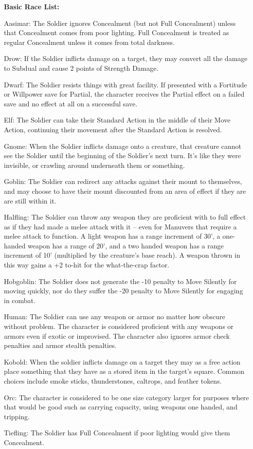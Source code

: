 \textbf{Basic Race List:}
\begin{description*}
\item[Aasimar:] The Soldier ignores Concealment (but not Full Concealment) unless that Concealment comes from poor lighting. Full Concealment is treated as regular Concealment unless it comes from total darkness.
\item[Drow:] If the Soldier inflicts damage on a target, they may convert all the damage to Subdual and cause 2 points of Strength Damage.
\item[Dwarf:] The Soldier resists things with great facility. If presented with a Fortitude or Willpower save for Partial, the character receives the Partial effect on a failed save and no effect at all on a successful save.
\item[Elf:] The Soldier can take their Standard Action in the middle of their Move Action, continuing their movement after the Standard Action is resolved.
\item[Gnome:] When the Soldier inflicts damage onto a creature, that creature cannot see the Soldier until the beginning of the Soldier's next turn. It's like they were invisible, or crawling around underneath them or something.
\item[Goblin:] The Soldier can redirect any attacks against their mount to themselves, and may choose to have their mount discounted from an area of effect if they are are still within it.
\item[Halfling:] The Soldier can throw any weapon they are proficient with to full effect as if they had made a melee attack with it -- even for Manuvers that require a melee attack to function. A light weapon has a range increment of 30', a one-handed weapon has a range of 20', and a two handed weapon has a range increment of 10' (multiplied by the creature's base reach). A weapon thrown in this way gains a +2 to-hit for the what-the-crap factor.
\item[Hobgoblin:] The Soldier does not generate the -10 penalty to Move Silently for moving quickly, nor do they suffer the -20 penalty to Move Silently for engaging in combat.
\item[Human:] The Soldier can use any weapon or armor no matter how obscure without problem. The character is considered proficient with any weapons or armors even if exotic or improvised. The character also ignores armor check penalties and armor stealth penalties.
\item[Kobold:] When the soldier inflicts damage on a target they may as a free action place something that they have as a stored item in the target's square. Common choices include smoke sticks, thunderstones, caltrops, and feather tokens.
\item[Orc:] The character is considered to be one size category larger for purposes where that would be good such as carrying capacity, using weapons one handed, and tripping.
\item[Tiefling:] The Soldier has Full Concealment if poor lighting would give them Concealment.
\end{description*}


